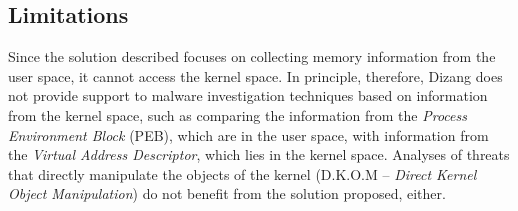 \documentclass[conference]{IEEEtran}
\newcommand{\fancyname}{Dizang }
\begin{document}
\subsection{Limitations}

Since the solution described focuses on collecting memory information from the user space, it cannot access the kernel space. 
%
In principle, therefore, \fancyname does not provide support to malware investigation techniques based on information from the kernel space, such as comparing the information from the \textit{Process Environment Block} (PEB), which are in the user space, with information from the \textit{Virtual Address Descriptor}, which lies in the kernel space. 
%
Analyses of threats that directly manipulate the objects of the kernel (D.K.O.M – \textit{Direct Kernel Object Manipulation}) do not benefit from the solution proposed, either. 


%
%



%
%
\end{document}
